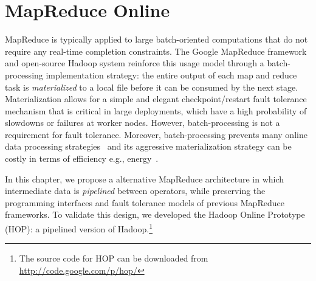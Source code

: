 \chapter[MapReduce Online]{MapReduce Online}
\label{ch:hop}

MapReduce is typically applied to large batch-oriented computations that do not
require any real-time completion constraints.  The Google MapReduce
framework~\cite{mapreduce-osdi} and open-source Hadoop system reinforce this
usage model through a batch-processing implementation strategy: the entire
output of each map and reduce task is {\em materialized} to a local file
before it can be consumed by the next stage.  Materialization allows for a
simple and elegant checkpoint/restart fault tolerance mechanism that is
critical in large deployments, which have a high probability of slowdowns or
failures at worker nodes.  However, batch-processing is not a requirement for
fault tolerance.  Moreover, batch-processing prevents many online data
processing strategies~\cite{onlineagg, borealis, stream, tcq-cidr} and its
aggressive materialization strategy can be costly in terms of efficiency e.g.,
energy~\cite{yanpei}.

In this chapter, we propose a alternative MapReduce architecture in which
intermediate data is {\em pipelined} between operators, while preserving the
programming interfaces and fault tolerance models of previous MapReduce
frameworks.  To validate this design, we developed the Hadoop Online Prototype
(HOP): a pipelined version of Hadoop.\footnote{The source code for HOP can be
downloaded from \url{http://code.google.com/p/hop/}}

